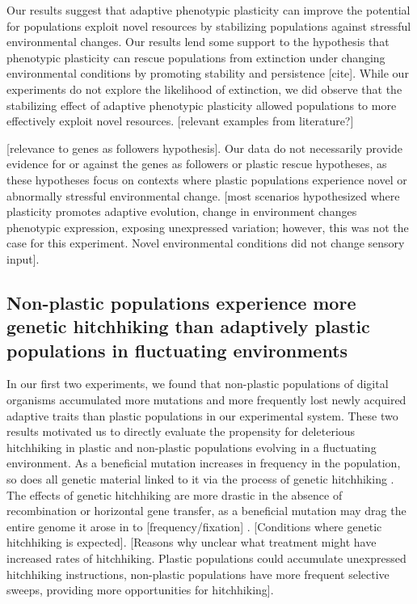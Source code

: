 Our results suggest that adaptive phenotypic plasticity can improve the potential for populations exploit novel resources by stabilizing populations against stressful environmental changes.
Our results lend some support to the hypothesis that phenotypic plasticity can rescue populations from extinction under changing environmental conditions by promoting stability and persistence [cite].
While our experiments do not explore the likelihood of extinction, we did observe that the stabilizing effect of adaptive phenotypic plasticity allowed populations to more effectively exploit novel resources.
[relevant examples from literature?]

[relevance to genes as followers hypothesis].
Our data do not necessarily provide evidence for or against the genes as followers or plastic rescue hypotheses, as these hypotheses focus on contexts where plastic populations experience novel or abnormally stressful environmental change.
[most scenarios hypothesized where plasticity promotes adaptive evolution, change in environment changes phenotypic expression, exposing unexpressed variation; however, this was not the case for this experiment. Novel environmental conditions did not change sensory input].

\vspace{0.25cm}
\subsection{Non-plastic populations experience more genetic hitchhiking than adaptively plastic populations in fluctuating environments}

In our first two experiments, we found that non-plastic populations of digital organisms accumulated more mutations and more frequently lost newly acquired adaptive traits than plastic populations in our experimental system.
These two results motivated us to directly evaluate the propensity for deleterious hitchhiking in plastic and non-plastic populations evolving in a fluctuating environment. 
As a beneficial mutation increases in frequency in the population, so does all genetic material linked to it via the process of genetic hitchhiking \cite{barton_genetic_2000, smith_hitch-hiking_1974}.
The effects of genetic hitchhiking are more drastic in  the absence of recombination or horizontal gene transfer, as a beneficial mutation may drag the entire genome it arose in to [frequency/fixation] \cite{smith_evolution_1990}.
[Conditions where genetic hitchhiking is expected].
[Reasons why unclear what treatment might have increased rates of hitchhiking. Plastic populations could accumulate unexpressed hitchhiking instructions, non-plastic populations have more frequent selective sweeps, providing more opportunities for hitchhiking].

